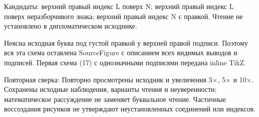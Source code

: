 Кандидаты: верхний правый индекс L поверх N; верхний правый индекс L поверх неразборчивого знака; верхний правый индекс N с правкой. Чтение не установлено в дипломатическом исходнике.\par
Неясна исходная буква под густой правкой у верхней правой подписи. Поэтому вся эта схема оставлена SourceFigure с описанием всех видимых выводов и подписей. Первая схема (17) с однозначными подписями передана inline TikZ.\par
Повторная сверка: Повторно просмотрены исходник и увеличения 3×, 5× и 10×. Сохранены исходные наблюдения, варианты чтения и неуверенности; математическое рассуждение не заменяет буквальное чтение. Частичные воссоздания рисунков не утверждают неустановленных соединений или индексов.\par\medskip
